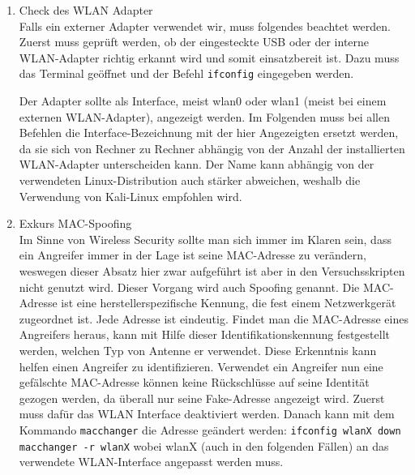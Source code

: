 \begin{enumerate}
	\item {Check des WLAN Adapter} \\
	Falls ein externer Adapter verwendet wir, muss folgendes beachtet werden. Zuerst muss geprüft werden, ob der eingesteckte USB oder der interne WLAN-Adapter richtig erkannt wird und somit einsatzbereit ist. Dazu muss das Terminal geöffnet und der Befehl \colorbox{altgray}{\lstinline|ifconfig|} eingegeben werden.

	Der Adapter sollte als Interface, meist wlan0 oder wlan1 (meist bei einem externen WLAN-Adapter), angezeigt werden. Im Folgenden muss bei allen Befehlen die Interface-Bezeichnung mit der hier Angezeigten ersetzt werden, da sie sich von Rechner zu Rechner abhängig von der Anzahl der installierten WLAN-Adapter unterscheiden kann. Der Name kann abhängig von der verwendeten Linux-Distribution auch stärker abweichen, weshalb die Verwendung von Kali-Linux empfohlen wird.

	\item {Exkurs MAC-Spoofing} \\
Im Sinne von Wireless Security sollte man sich immer im Klaren sein, dass ein Angreifer immer in der Lage ist seine MAC-Adresse zu verändern, weswegen dieser Absatz hier zwar aufgeführt ist aber in den Versuchsskripten nicht genutzt wird. Dieser Vorgang wird auch Spoofing genannt. Die MAC-Adresse ist eine herstellerspezifische Kennung, die fest einem Netzwerkgerät zugeordnet ist. Jede Adresse ist eindeutig. Findet man die MAC-Adresse eines Angreifers heraus, kann mit Hilfe dieser Identifikationskennung festgestellt werden, welchen Typ von Antenne er verwendet. Diese Erkenntnis kann helfen einen Angreifer zu identifizieren. Verwendet ein Angreifer nun eine gefälschte MAC-Adresse können keine Rückschlüsse auf seine Identität gezogen werden, da überall nur seine Fake-Adresse angezeigt wird. Zuerst muss dafür das WLAN Interface deaktiviert werden. Danach kann mit dem Kommando \colorbox{altgray}{\lstinline|macchanger|} die Adresse geändert werden:\newline
	\newline
	\colorbox{altgray}{\lstinline|ifconfig wlanX down|}\newline
	\newline
	\colorbox{altgray}{\lstinline|macchanger -r wlanX|}\newline
	\newline
	wobei wlanX (auch in den folgenden Fällen) an das verwendete WLAN-Interface angepasst werden muss.\newline


\end{enumerate}

